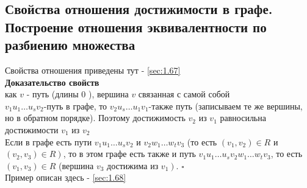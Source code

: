 \documentclass[a4paper]{article}
\newcommand{\qed}{\hfill$\square$}
\begin{document}
\subsection{Свойства отношения достижимости в графе. Построение отношения эквивалентности по разбиению множества}
Свойства отношения приведены тут - \ref{sec:1.67}\\[2mm]
\textbf{Доказательство свойств}\\[2mm]
 как $v$ - путь (длины 0 ), вершина $v$ связанная с самой собой\\[2mm]
 $v_{1} u_{1} \ldots u_{s} v_{2}$-путь в графе, то $v_{2} u_{s} \ldots u_{1} v_{1}$-также путь (записываем те же вершины, но в обратном порядке). Поэтому достижимость $v_{2}$ из $v_{1}$ равносильна достижимости $v_{1}$ из $v_{2}$\\[2mm]
\indent Если в графе есть пути $v_{1} u_{1} \ldots u_{s} v_{2}$ и $v_{2} w_{1} \ldots w_{t} v_{3}$ (то есть $\left(v_{1}, v_{2}\right) \in R$ и $\left.\left(v_{2}, v_{3}\right) \in R\right)$, то в этом графе есть также и путь $v_{1} u_{1} \ldots u_{s} v_{2} w_{1} \ldots w_{t} v_{3}$, то есть $\left(v_{1}, v_{3}\right) \in R$ (вершина $v_{3}$ достижима из $\left.v_{1}\right)$. \qed\\[2mm]
Пример описан здесь - \ref{sec:1.68}
\end{document}

